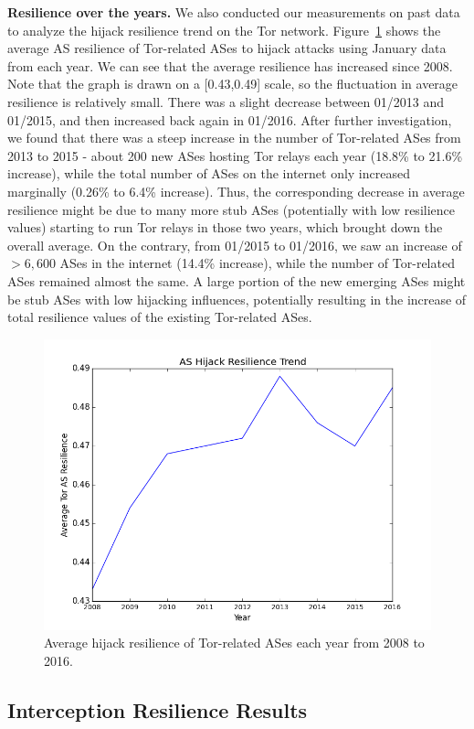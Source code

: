 {\bf Resilience over the years.} We also conducted our measurements on past data to analyze the hijack resilience trend on the Tor network.  Figure~\ref{fig:resilience_trend} shows the average AS resilience of Tor-related ASes to hijack attacks using January data from each year.  We can see that the average resilience has increased since 2008.  Note that the graph is drawn on a [0.43,0.49] scale, so the fluctuation in average resilience is relatively small. There was a slight decrease between 01/2013 and 01/2015, and then increased back again in 01/2016. After further investigation, we found that there was a steep increase in the number of Tor-related ASes from 2013 to 2015 - about 200 new ASes hosting Tor relays each year (18.8\% to 21.6\% increase), while the total number of ASes on the internet only increased marginally (0.26\% to 6.4\% increase). Thus, the corresponding decrease in average resilience might be due to many more stub ASes (potentially with low resilience values) starting to run Tor relays in those two years, which brought down the overall average. On the contrary, from 01/2015 to 01/2016, we saw an increase of $>6,600$ ASes in the internet (14.4\% increase), while the number of Tor-related ASes remained almost the same. A large portion of the new emerging ASes might be stub ASes with low hijacking influences, potentially resulting in the increase of total resilience values of the existing Tor-related ASes. 

\begin{figure}[ht!]
\centering
\includegraphics[width=.4\textwidth]{hijack_resilience_trend}
\caption{Average hijack resilience of Tor-related ASes each year from 2008 to 2016.}
\label{fig:resilience_trend}
\end{figure}

\subsection{Interception Resilience Results}

